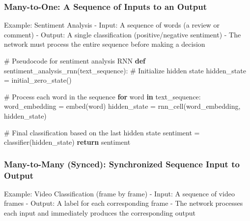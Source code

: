 \documentclass[
  letterpaper,
  DIV=11,
  numbers=noendperiod]{scrreprt}
\newenvironment{Shaded}{\begin{snugshade}}{\end{snugshade}}
\newcommand{\CommentTok}[1]{\textcolor[rgb]{0.37,0.37,0.37}{#1}}
\newcommand{\ControlFlowTok}[1]{\textcolor[rgb]{0.00,0.23,0.31}{\textbf{#1}}}
\newcommand{\KeywordTok}[1]{\textcolor[rgb]{0.00,0.23,0.31}{\textbf{#1}}}
\newcommand{\NormalTok}[1]{\textcolor[rgb]{0.00,0.23,0.31}{#1}}
\newcommand{\OperatorTok}[1]{\textcolor[rgb]{0.37,0.37,0.37}{#1}}
\begin{document}
\subsubsection{Many-to-One: A Sequence of Inputs to an
Output}\label{many-to-one-a-sequence-of-inputs-to-an-output}

Example: Sentiment Analysis - Input: A sequence of words (a review or
comment) - Output: A single classification (positive/negative sentiment)
- The network must process the entire sequence before making a decision

\begin{Shaded}
\begin{Highlighting}[]
\CommentTok{\# Pseudocode for sentiment analysis RNN}
\KeywordTok{def}\NormalTok{ sentiment\_analysis\_rnn(text\_sequence):}
    \CommentTok{\# Initialize hidden state}
\NormalTok{    hidden\_state }\OperatorTok{=}\NormalTok{ initial\_zero\_state()}
    
    \CommentTok{\# Process each word in the sequence}
    \ControlFlowTok{for}\NormalTok{ word }\KeywordTok{in}\NormalTok{ text\_sequence:}
\NormalTok{        word\_embedding }\OperatorTok{=}\NormalTok{ embed(word)}
\NormalTok{        hidden\_state }\OperatorTok{=}\NormalTok{ rnn\_cell(word\_embedding, hidden\_state)}
    
    \CommentTok{\# Final classification based on the last hidden state}
\NormalTok{    sentiment }\OperatorTok{=}\NormalTok{ classifier(hidden\_state)}
    \ControlFlowTok{return}\NormalTok{ sentiment}
\end{Highlighting}
\end{Shaded}

\subsubsection{Many-to-Many (Synced): Synchronized Sequence Input to
Output}\label{many-to-many-synced-synchronized-sequence-input-to-output}

Example: Video Classification (frame by frame) - Input: A sequence of
video frames - Output: A label for each corresponding frame - The
network processes each input and immediately produces the corresponding
output
\end{document}
